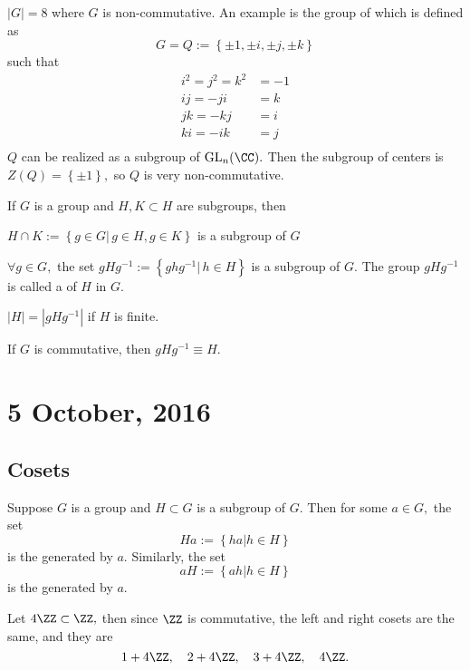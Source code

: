\documentclass{article}
\begin{document}
\begin{example*}
	$|G|=8$ where $G$ is non-commutative. An example is the group of  which is defined as \[G=Q:=\left\{ \pm 1, \pm i, \pm j, \pm k\right\}\] such that 
	\begin{align*}
		i^2=j^2=k^2 &= -1 \\
		ij = -ji &= k \\
		jk = -kj &= i \\
		ki = -ik &= j \\
	\end{align*} $Q$ can be realized as a subgroup of $\text{GL}_n(\CC).$ Then the subgroup of centers is $Z(Q)=\left\{ \pm 1 \right\},$ so $Q$ is very non-commutative.
\end{example*}

\begin{theorem*}
	If $G$ is a group and $H, K\subset H$ are subgroups, then
	\begin{enumerate}
		\ii $H\cap K:=\left\{ g\in G|\, g\in H, g\in K \right\}$ is a subgroup of $G$

		\ii $\forall g\in G,$ the set $gHg^{-1}:=\left\{ ghg^{-1}|\, h\in H \right\}$ is a subgroup of $G.$ The group $gHg^{-1}$ is called a  of $H$ in $G.$
	\end{enumerate}
\end{theorem*}

\begin{fact*}
	$|H|=|gHg^{-1}|$ if $H$ is finite.
\end{fact*}

\begin{fact*}
	If $G$ is commutative, then $gHg^{-1}\equiv H.$
\end{fact*}


\newpage

\section{5 October, 2016}
\subsection{Cosets}

Suppose $G$ is a group and $H\subset G$ is a subgroup of $G.$ Then for some $a\in G,$ the set \[Ha:=\left\{ ha|h\in H \right\}\] is the  generated by $a.$ Similarly, the set \[aH := \left\{ ah|h\in H \right\}\] is the  generated by $a.$

\begin{example*}
	Let $4\ZZ\subset\ZZ,$ then since $\ZZ$ is commutative, the left and right cosets are the same, and they are \[1+4\ZZ, \quad 2+4\ZZ, \quad 3+4\ZZ, \quad 4\ZZ.\]
\end{example*}
\end{document}
